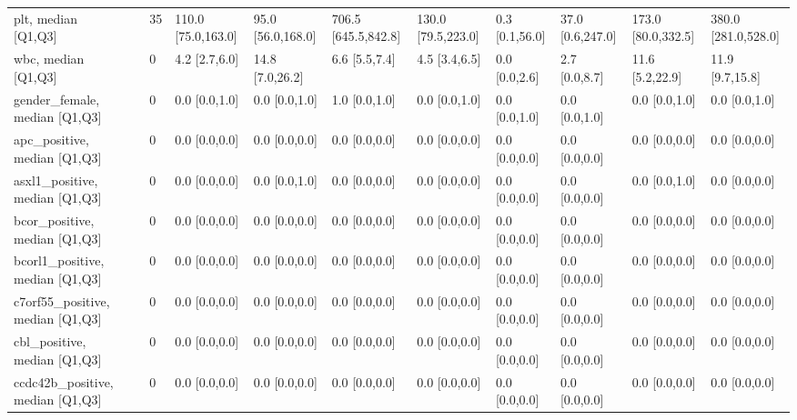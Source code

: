 \begin{tabular}{lllllllllll}
plt, median [Q1,Q3] &    &                   35 &  110.0 [75.0,163.0] &  95.0 [56.0,168.0] &  706.5 [645.5,842.8] &  130.0 [79.5,223.0] &    0.3 [0.1,56.0] &  37.0 [0.6,247.0] &  173.0 [80.0,332.5] &  380.0 [281.0,528.0] \\
wbc, median [Q1,Q3] &    &                    0 &       4.2 [2.7,6.0] &    14.8 [7.0,26.2] &        6.6 [5.5,7.4] &       4.5 [3.4,6.5] &     0.0 [0.0,2.6] &     2.7 [0.0,8.7] &     11.6 [5.2,22.9] &      11.9 [9.7,15.8] \\
gender\_female, median [Q1,Q3] &    &                    0 &       0.0 [0.0,1.0] &      0.0 [0.0,1.0] &        1.0 [0.0,1.0] &       0.0 [0.0,1.0] &     0.0 [0.0,1.0] &     0.0 [0.0,1.0] &       0.0 [0.0,1.0] &        0.0 [0.0,1.0] \\
apc\_positive, median [Q1,Q3] &    &                    0 &       0.0 [0.0,0.0] &      0.0 [0.0,0.0] &        0.0 [0.0,0.0] &       0.0 [0.0,0.0] &     0.0 [0.0,0.0] &     0.0 [0.0,0.0] &       0.0 [0.0,0.0] &        0.0 [0.0,0.0] \\
asxl1\_positive, median [Q1,Q3] &    &                    0 &       0.0 [0.0,0.0] &      0.0 [0.0,1.0] &        0.0 [0.0,0.0] &       0.0 [0.0,0.0] &     0.0 [0.0,0.0] &     0.0 [0.0,0.0] &       0.0 [0.0,1.0] &        0.0 [0.0,0.0] \\
bcor\_positive, median [Q1,Q3] &    &                    0 &       0.0 [0.0,0.0] &      0.0 [0.0,0.0] &        0.0 [0.0,0.0] &       0.0 [0.0,0.0] &     0.0 [0.0,0.0] &     0.0 [0.0,0.0] &       0.0 [0.0,0.0] &        0.0 [0.0,0.0] \\
bcorl1\_positive, median [Q1,Q3] &    &                    0 &       0.0 [0.0,0.0] &      0.0 [0.0,0.0] &        0.0 [0.0,0.0] &       0.0 [0.0,0.0] &     0.0 [0.0,0.0] &     0.0 [0.0,0.0] &       0.0 [0.0,0.0] &        0.0 [0.0,0.0] \\
c7orf55\_positive, median [Q1,Q3] &    &                    0 &       0.0 [0.0,0.0] &      0.0 [0.0,0.0] &        0.0 [0.0,0.0] &       0.0 [0.0,0.0] &     0.0 [0.0,0.0] &     0.0 [0.0,0.0] &       0.0 [0.0,0.0] &        0.0 [0.0,0.0] \\
cbl\_positive, median [Q1,Q3] &    &                    0 &       0.0 [0.0,0.0] &      0.0 [0.0,0.0] &        0.0 [0.0,0.0] &       0.0 [0.0,0.0] &     0.0 [0.0,0.0] &     0.0 [0.0,0.0] &       0.0 [0.0,0.0] &        0.0 [0.0,0.0] \\
ccdc42b\_positive, median [Q1,Q3] &    &                    0 &       0.0 [0.0,0.0] &      0.0 [0.0,0.0] &        0.0 [0.0,0.0] &       0.0 [0.0,0.0] &     0.0 [0.0,0.0] &     0.0 [0.0,0.0] &       0.0 [0.0,0.0] &        0.0 [0.0,0.0] \\

\end{tabular}
